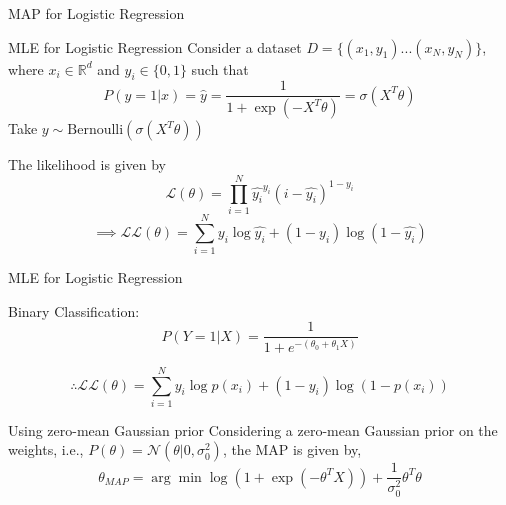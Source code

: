 \documentclass{beamer}
\begin{document}
\begin{section}{MAP for Logistic Regression}
    \begin{frame}{MLE for Logistic Regression}
        Consider a dataset $D = \{ (x_1, y_1) ... (x_N, y_N) \}$, where $x_i \in \mathbb{R}^d$ and $y_i \in \{ 0, 1 \}$ such that
        $$ P(y = 1 | x) = \hat{y} = \frac{1}{1 + \exp (- X^T \theta)} = \sigma (X^T \theta)$$
        Take $y \sim \text{Bernoulli} \left( \sigma (X^T \theta) \right)$

        \pause
        The likelihood is given by
        $$ \mathcal{L} (\theta) = \prod_{i=1}^{N} \hat{y_i}^{y_i} (i - \hat{y_i})^{1 - y_i}$$ 
        $$ \implies \mathcal{LL} (\theta) = \sum_{i=1}^{N} y_i \log \hat{y_i} + (1 - y_i) \log (1 - \hat{y_i}) $$ 
    \end{frame}

    \begin{frame}{MLE for Logistic Regression}

        Binary Classification:
        $$
            P (Y = 1 | X) = \frac{1}{1 + e^{- (\theta_0 + \theta_1 X)}}
        $$

        $$
            \therefore \mathcal{LL} (\theta) = \sum_{i=1}^{N} y_i \log p(x_i) + (1 - y_i) \log (1 - p(x_i))
        $$
    \end{frame}

    \begin{frame}{Using zero-mean Gaussian prior}
        Considering a zero-mean Gaussian prior on the weights, i.e., $P(\theta) = \mathcal{N}(\theta|0, \sigma_0^{2})$, the MAP is given by,
        \begin{equation*}
            \theta_{MAP} = \arg \min \log(1 + \exp(- \theta^T X)) + \frac{1}{\sigma_0^2} \theta^T \theta
        \end{equation*}
        

\end{frame}
\end{section}
\end{document}
